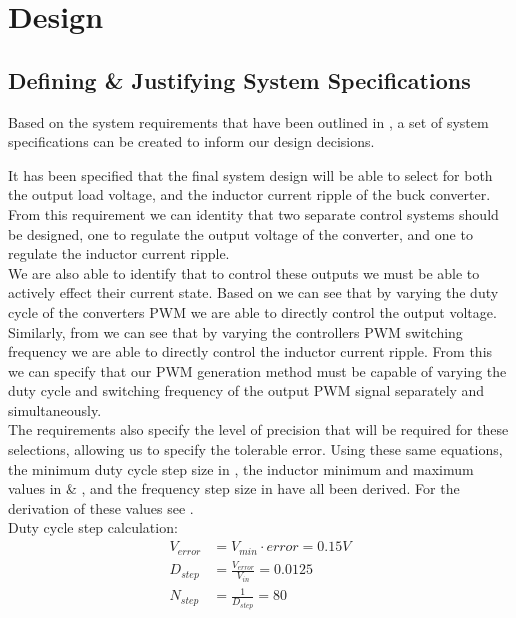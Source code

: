 \chapter{Design}\label{C:design}

\section{Defining \& Justifying System Specifications}\label{S:specs}

Based on the system requirements that have been outlined in , a set of system specifications can be created to inform our design decisions.

It has been specified that the final system design will be able to select for both the output load voltage, and the inductor current ripple of the buck converter. From this requirement we can identity that two separate control systems should be designed, one to regulate the output voltage of the converter, and one to regulate the inductor current ripple. \\

We are also able to identify that to control these outputs we must be able to actively effect their current state. Based on  we can see that by varying the duty cycle of the converters PWM we are able to directly control the output voltage. Similarly, from  we can see that by varying the controllers PWM switching frequency we are able to directly control the inductor current ripple. From this we can specify that our PWM generation method must be capable of varying the duty cycle and switching frequency of the output PWM signal separately and simultaneously. \\

The requirements also specify the level of precision that will be required for these selections, allowing us to specify the tolerable error. Using these same equations, the minimum duty cycle step size in , the inductor minimum and maximum values in  \& , and the frequency step size in  have all been derived. For the derivation of these values see .\\

Duty cycle step calculation:
\begin{align}
    V_{error} &= V_{min} \cdot error = 0.15V\\
    D_{step} &= \frac{V_{error}}{V_{in}} = 0.0125\\
    N_{step} &= \frac{1}{D_{step}} = 80 \label{E:duty_step}
\end{align}

